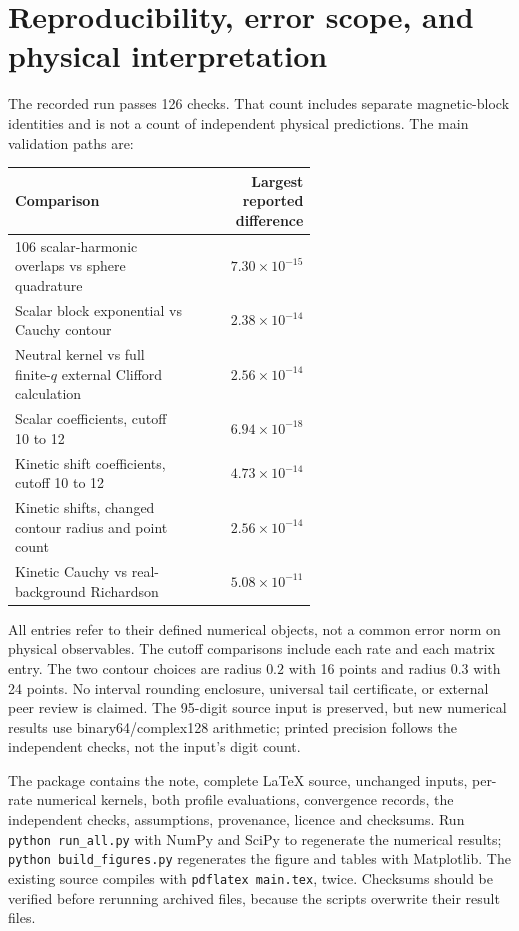 \documentclass[11pt,letterpaper]{article}
\begin{document}
\section{Reproducibility, error scope, and physical interpretation}

The recorded run passes 126 checks. That count includes separate magnetic-block identities and is not a count of independent physical predictions. The main validation paths are:
\begin{center}\small
\begin{tabular}{@{}p{0.60\linewidth}r@{}}\toprule
Comparison & Largest reported difference\\\midrule
106 scalar-harmonic overlaps vs sphere quadrature & $7.30\times10^{-15}$\\
Scalar block exponential vs Cauchy contour & $2.38\times10^{-14}$\\
Neutral kernel vs full finite-$q$ external Clifford calculation & $2.56\times10^{-14}$\\
Scalar coefficients, cutoff 10 to 12 & $6.94\times10^{-18}$\\
Kinetic shift coefficients, cutoff 10 to 12 & $4.73\times10^{-14}$\\
Kinetic shifts, changed contour radius and point count & $2.56\times10^{-14}$\\
Kinetic Cauchy vs real-background Richardson & $5.08\times10^{-11}$\\\bottomrule
\end{tabular}
\end{center}
All entries refer to their defined numerical objects, not a common error norm on physical observables. The cutoff comparisons include each rate and each matrix entry. The two contour choices are radius $0.2$ with 16 points and radius $0.3$ with 24 points. No interval rounding enclosure, universal tail certificate, or external peer review is claimed. The 95-digit source input is preserved, but new numerical results use binary64/complex128 arithmetic; printed precision follows the independent checks, not the input's digit count.

The package contains the note, complete LaTeX source, unchanged inputs, per-rate numerical kernels, both profile evaluations, convergence records, the independent checks, assumptions, provenance, licence and checksums. Run \texttt{python run\_all.py} with NumPy and SciPy to regenerate the numerical results; \texttt{python build\_figures.py} regenerates the figure and tables with Matplotlib. The existing source compiles with \texttt{pdflatex main.tex}, twice. Checksums should be verified before rerunning archived files, because the scripts overwrite their result files.
\end{document}
